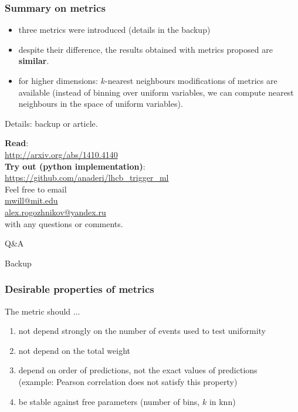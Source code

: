 \documentclass{beamer}
\begin{document}
\begin{frame}
    \frametitle{Summary on metrics}
    \begin{itemize}
        \item three metrics were introduced (details in the backup)
        \item despite their difference, the results obtained with metrics proposed are \textbf{similar}.
        \item for higher dimensions: $k$-nearest neighbours modifications of metrics are available 
        {\small (instead of binning over uniform variables, we can compute nearest neighbours in the space of uniform variables).}
    \end{itemize}

Details: backup or article.
\end{frame}


\begin{frame}

    \textbf{Read}: \\
    \url{http://arxiv.org/abs/1410.4140} 
    \bigskip
    \\

    \textbf{Try out (python implementation)}: \\
    \url{https://github.com/anaderi/lhcb_trigger_ml}
    \bigskip
    \\

    Feel free to email  \\
    \url{mwill@mit.edu} \\
    \url{alex.rogozhnikov@yandex.ru} \\
    with any questions or comments.
\end{frame}



\begin{frame}
\Huge{\centerline{Q\&A}}
\end{frame}


\begin{frame}
    \Huge{\centerline{Backup}}
\end{frame}


\begin{frame}
    \frametitle{Desirable properties of metrics}
    The metric should ...
    \begin{enumerate}
    \item not depend strongly on the number of events used to test uniformity

    \item not depend on the total weight 

    \item depend on order of predictions, not the exact values of predictions \\
        (example: Pearson correlation does not satisfy this property)

    \item be stable against free parameters (number of bins, $k$ in knn)
    \end{enumerate}
\end{frame}
\end{document}
